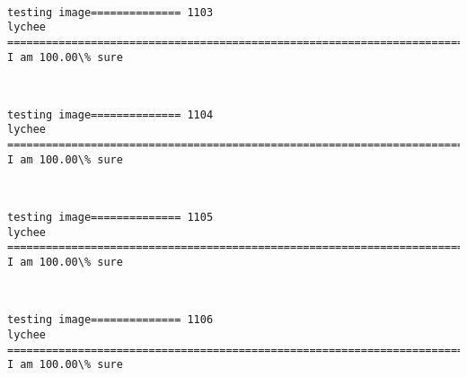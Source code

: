 \documentclass[11pt]{article}
\begin{document}
    \begin{center}
    \end{center}
    { \hspace*{\fill} \\}
    
    \begin{Verbatim}[commandchars=\\\{\}]
testing image============== 1103
lychee
============================================================================
I am 100.00\% sure

    \end{Verbatim}

    \begin{center}
    \end{center}
    { \hspace*{\fill} \\}
    
    \begin{Verbatim}[commandchars=\\\{\}]
testing image============== 1104
lychee
============================================================================
I am 100.00\% sure

    \end{Verbatim}

    \begin{center}
    \end{center}
    { \hspace*{\fill} \\}
    
    \begin{Verbatim}[commandchars=\\\{\}]
testing image============== 1105
lychee
============================================================================
I am 100.00\% sure

    \end{Verbatim}

    \begin{center}
    \end{center}
    { \hspace*{\fill} \\}
    
    \begin{Verbatim}[commandchars=\\\{\}]
testing image============== 1106
lychee
============================================================================
I am 100.00\% sure

    \end{Verbatim}
\end{document}
